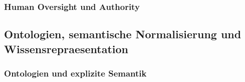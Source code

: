 \subsubsection{Human Oversight und Authority}
\label{sec:human_oversight}

%
%
%
%
%
%
%
%


\subsection{Ontologien, semantische Normalisierung und Wissensrepraesentation}
\label{sec:ontology_foundation}

\subsubsection{Ontologien und explizite Semantik}
\label{sec:ontology_definition}

%
%
%
%
%
%
%


